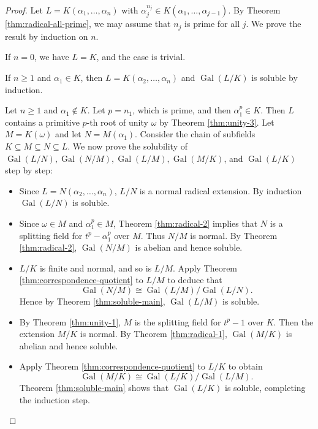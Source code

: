 \documentclass[12pt]{article}
\theoremstyle{definition}
\newcommand{\Gal}{\operatorname{Gal}}
\begin{document}
\begin{proof}
Let $L=K\left(\alpha_1, \ldots, \alpha_n\right)$ with $\alpha_j^{n_j} \in K\left(\alpha_1, \ldots, \alpha_{j-1}\right)$. By Theorem \ref{thm:radical-all-prime}, we may assume that $n_j$ is prime for all $j$. We prove the result by induction on $n$. 

If $n = 0$, we have $L = K$, and the case is trivial.

If $n \ge 1$ and $\alpha_1 \in K$, then $L=K\left(\alpha_2, \ldots, \alpha_n\right)$ and $\Gal(L / K)$ is soluble by induction.

Let $n \ge 1$ and $\alpha_1 \notin K$. Let $p = n_1$, which is prime, and then $\alpha_1^p \in K$.  Then $L$ contains a primitive $p$-th root of unity $\omega$ by Theorem \ref{thm:unity-3}. Let $M = K(\omega)$ and let $N = M(\alpha_1)$. Consider the chain of subfields $K \subseteq M \subseteq N \subseteq L$. We now prove the solubility of $\Gal(L/N), \Gal(N/M), \Gal(L/M), \Gal(M/K)$, and $\Gal(L/K)$ step by step:

\begin{itemize}
    \item Since $L=N\left(\alpha_2, \ldots, \alpha_n\right)$, $L / N$ is a normal radical extension. By induction $\Gal\left(L / N\right)$ is soluble. 
    \item Since $ \omega \in M$ and $\alpha_1^p \in M$, Theorem \ref{thm:radical-2} implies that $N$ is a splitting field for $t^p-\alpha_1^p$ over $M$. Thus $N / M$ is normal. By Theorem \ref{thm:radical-2}, $\Gal\left(N / M\right)$ is abelian and hence soluble. 
    \item  $L/ K$ is finite and normal, and so is $L / M$. Apply Theorem \ref{thm:correspondence-quotient} to $L / M$ to deduce that
    $$
    \Gal\left( N / M \right) \cong \Gal(L / M) / \Gal\left(L / N\right).
    $$
    Hence by Theorem \ref{thm:soluble-main},  $ \Gal(L / M)$ is soluble.
    \item By Theorem \ref{thm:unity-1}, $M$ is the splitting field for $t^p-1$ over $K$. Then the extension $M / K$ is normal. By Theorem \ref{thm:radical-1}, $\Gal(M / K)$ is abelian and hence soluble.
    \item  Apply Theorem \ref{thm:correspondence-quotient} to $L / K$ to obtain
    $$
    \Gal(M / K) \cong \Gal(L / K) / \Gal(L / M). 
    $$
    Theorem \ref{thm:soluble-main} shows that $\Gal(L / K)$ is soluble, completing the induction step.
\end{itemize}
\end{proof}
\end{document}
